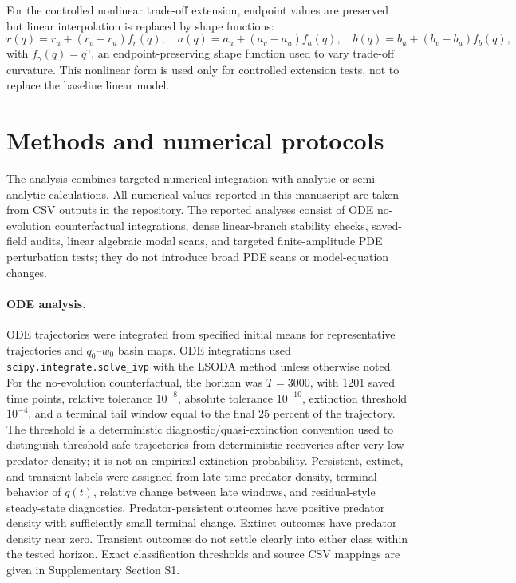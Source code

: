 \documentclass[11pt]{article}
\begin{document}
For the controlled nonlinear trade-off extension, endpoint values are preserved but linear interpolation is replaced by shape functions:
\[
r(q)=r_u+(r_v-r_u)f_r(q),
\quad
a(q)=a_u+(a_v-a_u)f_a(q),
\quad
b(q)=b_u+(b_v-b_u)f_b(q),
\]
with \(f_\gamma(q)=q^\gamma\), an endpoint-preserving shape function used to vary trade-off curvature. This nonlinear form is used only for controlled extension tests, not to replace the baseline linear model.

\section{Methods and numerical protocols}

The analysis combines targeted numerical integration with analytic or semi-analytic calculations. All numerical values reported in this manuscript are taken from CSV outputs in the repository. The reported analyses consist of ODE no-evolution counterfactual integrations, dense linear-branch stability checks, saved-field audits, linear algebraic modal scans, and targeted finite-amplitude PDE perturbation tests; they do not introduce broad PDE scans or model-equation changes.

\paragraph{ODE analysis.}
ODE trajectories were integrated from specified initial means for representative trajectories and \(q_0\)--\(w_0\) basin maps. ODE integrations used \texttt{scipy.integrate.solve\_ivp} with the LSODA method unless otherwise noted. For the no-evolution counterfactual, the horizon was \(T=3000\), with 1201 saved time points, relative tolerance \(10^{-8}\), absolute tolerance \(10^{-10}\), extinction threshold \(10^{-4}\), and a terminal tail window equal to the final 25 percent of the trajectory. The threshold is a deterministic diagnostic/quasi-extinction convention used to distinguish threshold-safe trajectories from deterministic recoveries after very low predator density; it is not an empirical extinction probability. Persistent, extinct, and transient labels were assigned from late-time predator density, terminal behavior of \(q(t)\), relative change between late windows, and residual-style steady-state diagnostics. Predator-persistent outcomes have positive predator density with sufficiently small terminal change. Extinct outcomes have predator density near zero. Transient outcomes do not settle clearly into either class within the tested horizon. Exact classification thresholds and source CSV mappings are given in Supplementary Section S1.
\end{document}
